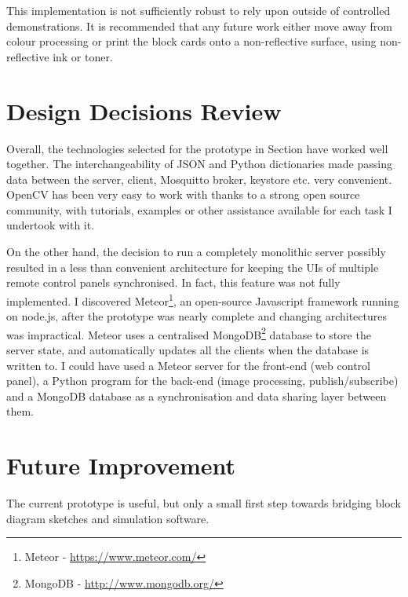 This implementation is not sufficiently robust to rely upon outside of controlled demonstrations. It is recommended that any future work either move away from colour processing or print the block cards onto a non-reflective surface, using non-reflective ink or toner.

\section{Design Decisions Review}
\label{ch:review:design}

Overall, the technologies selected for the prototype in Section \label{sec:techSelection} have worked well together. The interchangeability of JSON and Python dictionaries made passing data between the server, client, Mosquitto broker, keystore etc. very convenient. OpenCV has been very easy to work with thanks to a strong open source community, with tutorials, examples or other assistance available for each task I undertook with it.

On the other hand, the decision to run a completely monolithic server possibly resulted in a less than convenient architecture for keeping the UIs of multiple remote control panels synchronised. In fact, this feature was not fully implemented. I discovered Meteor\footnote{Meteor - \url{https://www.meteor.com/}}, an open-source Javascript framework running on node.js, after the prototype was nearly complete and changing architectures was impractical. Meteor uses a centralised MongoDB\footnote{MongoDB - \url{http://www.mongodb.org/}} database to store the server state, and automatically updates all the clients when the database is written to. I could have used a Meteor server for the front-end (web control panel), a Python program for the back-end (image processing, publish/subscribe) and a MongoDB database as a synchronisation and data sharing layer between them.

\section{Future Improvement}

The current prototype is useful, but only a small first step towards bridging block diagram sketches and simulation software. 

